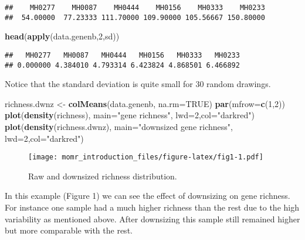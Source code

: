 \documentclass[]{article}
\newenvironment{Shaded}{\begin{snugshade}}{\end{snugshade}}
\newcommand{\KeywordTok}[1]{\textcolor[rgb]{0.13,0.29,0.53}{\textbf{{#1}}}}
\newcommand{\DataTypeTok}[1]{\textcolor[rgb]{0.13,0.29,0.53}{{#1}}}
\newcommand{\DecValTok}[1]{\textcolor[rgb]{0.00,0.00,0.81}{{#1}}}
\newcommand{\StringTok}[1]{\textcolor[rgb]{0.31,0.60,0.02}{{#1}}}
\newcommand{\OtherTok}[1]{\textcolor[rgb]{0.56,0.35,0.01}{{#1}}}
\newcommand{\NormalTok}[1]{{#1}}
\begin{document}
\begin{verbatim}
##    MH0277    MH0087    MH0444    MH0156    MH0333    MH0233 
##  54.00000  77.23333 111.70000 109.90000 105.56667 150.80000
\end{verbatim}

\begin{Shaded}
\begin{Highlighting}[]
\KeywordTok{head}\NormalTok{(}\KeywordTok{apply}\NormalTok{(data.genenb,}\DecValTok{2}\NormalTok{,sd))}
\end{Highlighting}
\end{Shaded}

\begin{verbatim}
##   MH0277   MH0087   MH0444   MH0156   MH0333   MH0233 
## 0.000000 4.384010 4.793314 6.423824 4.868501 6.466892
\end{verbatim}

Notice that the standard deviation is quite small for 30 random
drawings.

\begin{Shaded}
\begin{Highlighting}[]
\NormalTok{richness.dwnz <-}\StringTok{ }\KeywordTok{colMeans}\NormalTok{(data.genenb, }\DataTypeTok{na.rm=}\OtherTok{TRUE}\NormalTok{)}
\KeywordTok{par}\NormalTok{(}\DataTypeTok{mfrow=}\KeywordTok{c}\NormalTok{(}\DecValTok{1}\NormalTok{,}\DecValTok{2}\NormalTok{))}
\KeywordTok{plot}\NormalTok{(}\KeywordTok{density}\NormalTok{(richness), }\DataTypeTok{main=}\StringTok{"gene richness"}\NormalTok{, }\DataTypeTok{lwd=}\DecValTok{2}\NormalTok{,}\DataTypeTok{col=}\StringTok{"darkred"}\NormalTok{)}
\KeywordTok{plot}\NormalTok{(}\KeywordTok{density}\NormalTok{(richness.dwnz), }\DataTypeTok{main=}\StringTok{"downsized gene richness"}\NormalTok{, }\DataTypeTok{lwd=}\DecValTok{2}\NormalTok{,}\DataTypeTok{col=}\StringTok{"darkred"}\NormalTok{)}
\end{Highlighting}
\end{Shaded}

\begin{figure}[htbp]
\centering
\texttt{[image: momr\_introduction\_files/figure-latex/fig1-1.pdf]}
\caption{Raw and downsized richness distribution.}
\end{figure}

In this example (Figure 1) we can see the effect of downsizing on gene
richness. For instance one sample had a much higher richness than the
rest due to the high variability as mentioned above. After downsizing
this sample still remained higher but more comparable with the rest.
\end{document}
